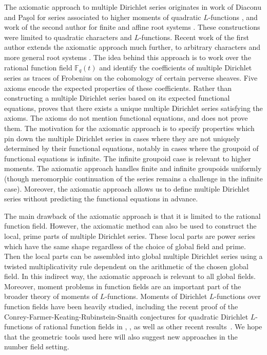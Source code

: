 \documentclass[11pt,letterpaper]{article}
\theoremstyle{definition}
\theoremstyle{remark}
\numberwithin{equation}{section}
\theoremstyle{dotless}
\newcommand{\F}{\mathbb{F}}
\begin{document}
The axiomatic approach to multiple Dirichlet series originates in work of Diaconu and Pa\c{s}ol for series associated to higher moments of quadratic $L$-functions \cite{DiaconuPasol}, and work of the second author for finite and affine root systems \cite{WhiteheadThesis, WhiteheadTypeA}. These constructions were limited to quadratic characters and $L$-functions. Recent work of the first author extends the axiomatic approach much further, to arbitrary characters and more general root systems \cite{s-amds}. The idea behind this approach is to work over the rational function field $\F_q(t)$ and identify the coefficients of multiple Dirichlet series as traces of Frobenius on the cohomology of certain perverse sheaves. Five axioms encode the expected properties of these coefficients. Rather than constructing a multiple Dirichlet series based on its expected functional equations, \cite{s-amds} proves that there exists a unique multiple Dirichlet series satisfying the axioms. The axioms do not mention functional equations, and \cite{s-amds} does not prove them. The motivation for the axiomatic approach is to specify properties which pin down the multiple Dirichlet series in cases where they are not uniquely determined by their functional equations, notably in cases where the groupoid of functional equations is infinite. The infinite groupoid case is relevant to higher moments. The axiomatic approach handles finite and infinite groupoids uniformly (though meromorphic continuation of the series remains a challenge in the infinite case). Moreover, the axiomatic approach allows us to define multiple Dirichlet series without predicting the functional equations in advance. 

The main drawback of the axiomatic approach is that it is limited to the rational function field. However, the axiomatic method can also be used to construct the local, prime parts of multiple Dirichlet series. These local parts are power series which have the same shape regardless of the choice of global field and prime. Then the local parts can be assembled into global multiple Dirichlet series using a twisted multiplicativity rule dependent on the arithmetic of the chosen global field. In this indirect way, the axiomatic approach is relevant to all global fields. Moreover, moment problems in function fields are an important part of the broader theory of moments of $L$-functions. Moments of Dirichlet $L$-functions over function fields have been heavily studied, including the recent proof of the Conrey-Farmer-Keating-Rubinstein-Snaith conjectures for quadratic Dirichlet $L$-functions of rational function fields in \cite{BDPW}, \cite{MPPRW}, as well as other recent results~\cite{David2021,David2022,David2025,Gao2023,Gao2025}. We hope that the geometric tools used here will also suggest new approaches in the number field setting. 
\end{document}
